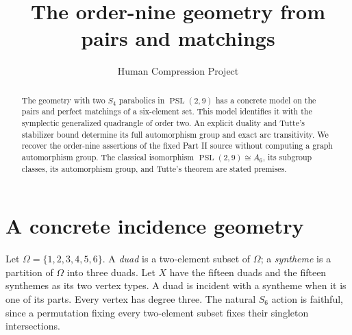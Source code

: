 \documentclass[11pt]{article}
\title{The order-nine geometry from pairs and matchings}
\author{Human Compression Project}\date{}
\newcommand{\PSL}{\operatorname{PSL}}
\begin{document}
\maketitle
\begin{abstract}
The geometry with two $S_4$ parabolics in $\PSL(2,9)$ has a concrete
model on the pairs and perfect matchings of a six-element set. This
model identifies it with the symplectic generalized quadrangle of order
two. An explicit duality and Tutte's stabilizer bound determine its
full automorphism group and exact arc transitivity. We recover the
order-nine assertions of the fixed Part II source without computing a
graph automorphism group. The classical isomorphism
$\PSL(2,9)\cong A_6$, its subgroup classes, its automorphism group,
and Tutte's theorem are stated premises.
\end{abstract}

\section{A concrete incidence geometry}
Let $\Omega=\{1,2,3,4,5,6\}$. A \emph{duad} is a two-element
subset of $\Omega$; a \emph{syntheme} is a partition of $\Omega$
into three duads. Let $X$ have the fifteen duads and the fifteen
synthemes as its two vertex types. A duad is incident with a syntheme
when it is one of its parts. Every vertex has degree three. The
natural $S_6$ action is faithful, since a permutation fixing every
two-element subset fixes their singleton intersections.
\end{document}
